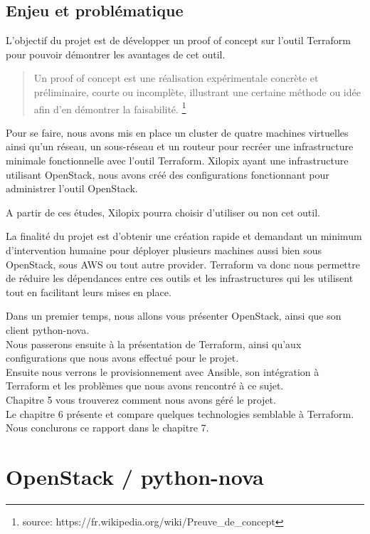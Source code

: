 \documentclass[]{article}
\begin{document}
\subsection{Enjeu et problématique}\label{enjeu-et-probluxe9matique}

L'objectif du projet est de développer un proof of concept sur l'outil
Terraform pour pouvoir démontrer les avantages de cet outil.

\begin{quote}
Un proof of concept est une réalisation expérimentale concrète et
préliminaire, courte ou incomplète, illustrant une certaine méthode ou
idée afin d'en démontrer la faisabilité. \footnote{source: https://fr.wikipedia.org/wiki/Preuve\_de\_concept}
\end{quote}

Pour se faire, nous avons mis en place un cluster de quatre machines
virtuelles ainsi qu'un réseau, un sous-réseau et un routeur pour recréer
une infrastructure minimale fonctionnelle avec l'outil Terraform.
Xilopix ayant une infrastructure utilisant OpenStack, nous avons créé
des configurations fonctionnant pour administrer l'outil OpenStack.

A partir de ces études, Xilopix pourra choisir d'utiliser ou non cet
outil.

La finalité du projet est d'obtenir une création rapide et demandant un
minimum d'intervention humaine pour déployer plusieurs machines aussi
bien sous OpenStack, sous AWS ou tout autre provider. Terraform va donc
nous permettre de réduire les dépendances entre ces outils et les
infrastructures qui les utilisent tout en facilitant leurs mises en place.

\vspace{0,5cm}
Dans un premier temps, nous allons vous présenter OpenStack, ainsi que son client python-nova.\\
Nous passerons ensuite à la présentation de Terraform, ainsi qu'aux configurations que nous avons effectué pour le projet.\\
Ensuite nous verrons le provisionnement avec Ansible, son intégration à Terraform et les problèmes que nous avons rencontré  à ce sujet. \\
Chapitre 5 vous trouverez comment nous avons géré le projet.\\
Le chapitre 6 présente et compare quelques technologies semblable à Terraform. \\
Nous conclurons ce rapport dans le chapitre 7.


\newpage
\section{OpenStack / python-nova}\label{OpenStack-python-nova}
\end{document}
